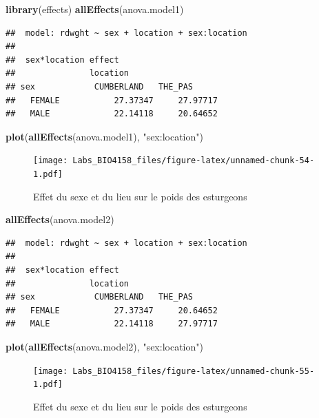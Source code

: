 \documentclass[
  12pt,
]{book}
\newenvironment{Shaded}{\begin{snugshade}}{\end{snugshade}}
\newcommand{\KeywordTok}[1]{\textcolor[rgb]{0.13,0.29,0.53}{\textbf{#1}}}
\newcommand{\NormalTok}[1]{#1}
\newcommand{\StringTok}[1]{\textcolor[rgb]{0.31,0.60,0.02}{#1}}
\begin{document}
\begin{Shaded}
\begin{Highlighting}[]
\KeywordTok{library}\NormalTok{(effects)}
\KeywordTok{allEffects}\NormalTok{(anova.model1)}
\end{Highlighting}
\end{Shaded}

\begin{verbatim}
##  model: rdwght ~ sex + location + sex:location
## 
##  sex*location effect
##               location
## sex            CUMBERLAND   THE_PAS     
##   FEMALE           27.37347     27.97717
##   MALE             22.14118     20.64652
\end{verbatim}

\begin{Shaded}
\begin{Highlighting}[]
\KeywordTok{plot}\NormalTok{(}\KeywordTok{allEffects}\NormalTok{(anova.model1), }\StringTok{"sex:location"}\NormalTok{)}
\end{Highlighting}
\end{Shaded}

\begin{figure}
\centering
\texttt{[image: Labs\_BIO4158\_files/figure-latex/unnamed-chunk-54-1.pdf]}
\caption{\label{fig:unnamed-chunk-54}Effet du sexe et du lieu sur le poids des esturgeons}
\end{figure}

\begin{Shaded}
\begin{Highlighting}[]
\KeywordTok{allEffects}\NormalTok{(anova.model2)}
\end{Highlighting}
\end{Shaded}

\begin{verbatim}
##  model: rdwght ~ sex + location + sex:location
## 
##  sex*location effect
##               location
## sex            CUMBERLAND   THE_PAS     
##   FEMALE           27.37347     20.64652
##   MALE             22.14118     27.97717
\end{verbatim}

\begin{Shaded}
\begin{Highlighting}[]
\KeywordTok{plot}\NormalTok{(}\KeywordTok{allEffects}\NormalTok{(anova.model2), }\StringTok{"sex:location"}\NormalTok{)}
\end{Highlighting}
\end{Shaded}

\begin{figure}
\centering
\texttt{[image: Labs\_BIO4158\_files/figure-latex/unnamed-chunk-55-1.pdf]}
\caption{\label{fig:unnamed-chunk-55}Effet du sexe et du lieu sur le poids des esturgeons}
\end{figure}
\end{document}
